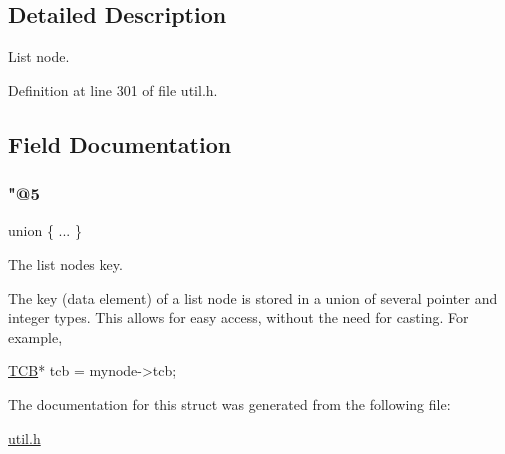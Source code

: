 \subsection{Detailed Description}
List node. 

Definition at line 301 of file util.\+h.



\subsection{Field Documentation}
\mbox{\label{structresource__list__node_aba8874eccf1ac3e7657c726a4f86536c}} 
\subsubsection{\texorpdfstring{"@5}{@5}}
{\footnotesize\ttfamily union \{ ... \} }



The list node\textquotesingle{}s key. 

The key (data element) of a list node is stored in a union of several pointer and integer types. This allows for easy access, without the need for casting. For example, 
\begin{DoxyCode}
\hyperlink{structthread__control__block}{TCB}* tcb = mynode->tcb;
\end{DoxyCode}
 

The documentation for this struct was generated from the following file\+:\begin{DoxyCompactItemize}
\item 
\hyperlink{util_8h}{util.\+h}\end{DoxyCompactItemize}
